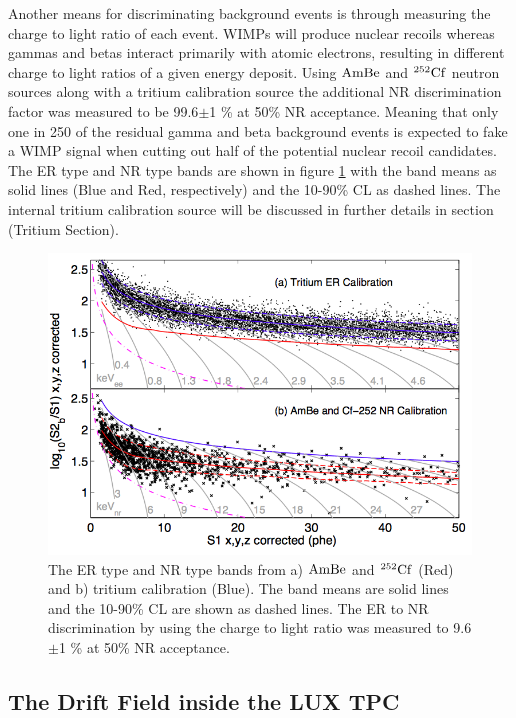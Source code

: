 Another means for discriminating background events is through measuring the charge to light ratio of each event. WIMPs will produce nuclear recoils whereas gammas and betas interact primarily with atomic electrons, resulting in different charge to light ratios of a given energy deposit. Using $\rm AmBe$ and $\rm ^{252}Cf$ neutron sources along with a tritium calibration source the additional NR discrimination factor was measured to be 99.6$\pm$1 \% at 50\% NR acceptance. Meaning that only one in 250 of the residual gamma and beta background events is expected to fake a WIMP signal when cutting out half of the potential nuclear recoil candidates. The ER type and NR type bands are shown in figure \ref{fig:LUX_ER_NR_Band} with the band means as solid lines (Blue and Red, respectively) and the 10-90\% CL as dashed lines. The internal tritium calibration source will be discussed in further details in section (Tritium Section).

 \begin{figure}[h!]\centering
\includegraphics[scale=.45]{Chapter_LUX_Det/ER_NR_Band_Cal.png}
\caption{The ER type and NR type bands from a) $\rm AmBe$ and $\rm ^{252}Cf$ (Red)  and b) tritium calibration (Blue). The band means are solid lines and the 10-90\% CL are shown as dashed lines. The ER to NR discrimination by using the charge to light ratio was measured to 9.6$\pm$1 \% at 50\% NR acceptance.}
\label{fig:LUX_ER_NR_Band}
\end{figure}


\subsection{The Drift Field inside the LUX TPC}

